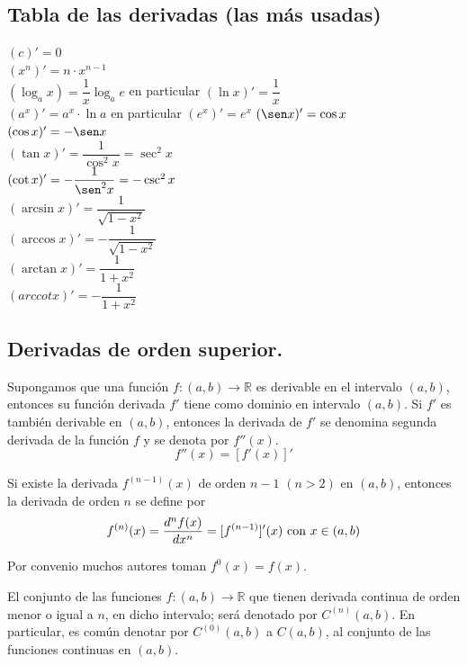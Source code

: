 \documentclass[10pt,twoside]{SelfArx} %
\begin{document}
\subsection{Tabla de las derivadas (las más usadas)}
$ (c)'=0 $\\
$ (x^{n})'=n\cdot x^{n-1} $\\
$ (\log_{a}x)=\dfrac{1}{x}\log_{a}e $ en particular $ (\ln x)'= \dfrac{1}{x} $\\
$ (a^{x})'=a^{x}\cdot\ln a $ en particular  $ (e^{x})'=e^{x} $
$ (\sen x)'=\cos x $\\
$ (\cos x)'=-\sen x $\\
$ (\tan x)'=\dfrac{1}{\cos^{2} x}=\sec^{2}x $\\
$ (\cot x)'=-\dfrac{1}{\sen^{2}x}=-\csc^{2}x $\\
$ (\arcsin x)'=\dfrac{1}{\sqrt{1-x^{2}}} $\\
$ (\arccos x)'=-\dfrac{1}{\sqrt{1-x^{2}}} $\\
$ (\arctan x)'=\dfrac{1}{1+x^{2}} $\\
$ (arccot x)'=-\dfrac{1}{1+x^{2}} $\\



\subsection{Derivadas de orden superior.}
Supongamos que una funci\'on $ f:(a,b)\rightarrow\mathbb{R} $ es derivable en el intervalo $ (a,b) $, entonces su función derivada $ f' $ tiene como dominio en intervalo $ (a,b) $.
Si $ f' $ es tambi\'en derivable en $ (a,b) $, entonces la derivada de $ f' $ se denomina segunda derivada de la función $ f $ y se denota por $ f''(x) $.
\[ f''(x)=[f'(x)]' \]
\begin{thm}
	Si existe la derivada $ f^{(n-1)}(x) $ de orden $ n-1 $ $ (n>2) $ en $ (a,b) $, entonces la derivada de orden $ n $ se define por
	\begin{equation}
	f^{(n)}(x)=\dfrac{d^{n}f(x)}{dx^{n}}=[f^{(n-1)}]'(x)  \hbox{ con $x\in(a,b)  $}
	\end{equation}
\end{thm}
Por convenio muchos autores toman $ f^{0}(x)=f(x) $.\\
\begin{thm}
El conjunto de las funciones $ f:(a,b)\rightarrow\mathbb{R} $ que tienen \textsf{derivada continua de orden menor o igual a $ n $}, en dicho intervalo; ser\'a denotado por $ C^{(n)}(a,b) $. En particular, es com\'un denotar por $ C^{(0)}(a,b) $ a $ C(a,b) $, al conjunto de las funciones continuas en $ (a,b) $.
\end{thm}
\end{document}
